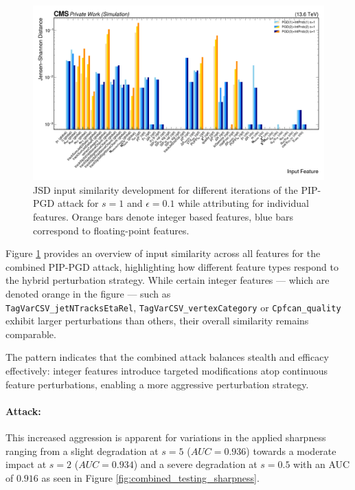 \begin{figure}[h]
\centering
    \includegraphics[width=15cm]{media/output/features/compare/jsd_comb_per_feature.png}
    \caption{JSD input similarity development for different iterations of the PIP-PGD attack for $s=1$ and $\epsilon=0.1$ while attributing for individual features. Orange bars denote integer based features, blue bars correspond to floating-point features.}
    \label{fig:combined_joint_overview}
\end{figure}

Figure \ref{fig:combined_joint_overview} provides an overview of input similarity across all features for the combined PIP-PGD attack, highlighting how different feature types respond to the hybrid perturbation strategy. While certain integer features — which are denoted orange in the figure — such as \\ \texttt{TagVarCSV\_jetNTracksEtaRel}, \texttt{TagVarCSV\_vertexCategory} or \texttt{Cpfcan\_quality} exhibit larger perturbations than others, their overall similarity remains comparable.

The pattern indicates that the combined attack balances stealth and efficacy effectively: integer features introduce targeted modifications atop continuous feature perturbations, enabling a more aggressive perturbation strategy.

\paragraph{Attack:} This increased aggression is apparent for variations in the applied sharpness ranging from a slight degradation at $s=5$ ($AUC=0.936$) towards a moderate impact at $s=2$ ($AUC=0.934$) and a severe degradation at $s=0.5$ with an AUC of $0.916$  as seen in Figure \ref{fig:combined_testing_sharpness}.

